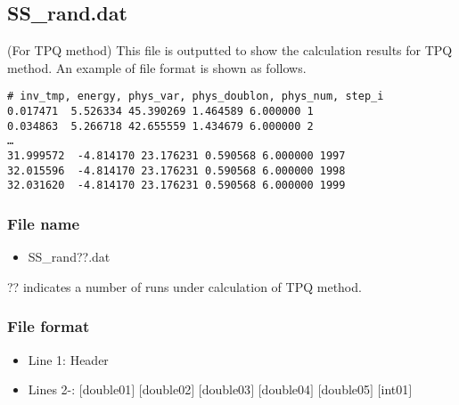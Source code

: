 \subsection{SS\_rand.dat}
\label{Subsec:ssrand}
(For TPQ method) This file is outputted to show the calculation results for TPQ method.
An example of file format is shown as follows.\\
\begin{minipage}{15cm}
\begin{screen}
\begin{verbatim}
# inv_tmp, energy, phys_var, phys_doublon, phys_num, step_i
0.017471  5.526334 45.390269 1.464589 6.000000 1
0.034863  5.266718 42.655559 1.434679 6.000000 2
…
31.999572  -4.814170 23.176231 0.590568 6.000000 1997
32.015596  -4.814170 23.176231 0.590568 6.000000 1998
32.031620  -4.814170 23.176231 0.590568 6.000000 1999
\end{verbatim}
\end{screen}
\end{minipage}

\subsubsection{File name}
 \begin{itemize}
   \item SS\_rand??.dat
  \end{itemize}
  ?? indicates a number of runs under calculation of TPQ method.

\subsubsection{File format}
\begin{itemize}
   \item Line 1: Header
   \item Lines 2-: $[$double01$]$ $[$double02$]$ $[$double03$]$ $[$double04$]$ $[$double05$]$ $[$int01$]$
  \end{itemize}
